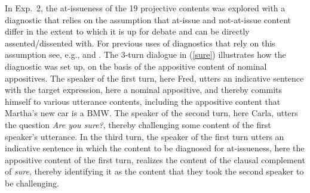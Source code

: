 \documentclass[11pt,fleqn]{article}
\newcommand{\6}{\mbox{$[\hspace*{-.6mm}[$}}
\newcommand{\9}{\mbox{$]\hspace*{-.6mm}]$}}
\begin{document}
In Exp.~2, the at-issueness of the 19 projective contents was explored with a diagnostic that relies on the assumption that at-issue and not-at-issue content differ in the extent to which it is up for debate and can be directly assented/dissented with. For previous uses of diagnostics that rely on this assumption see, e.g., \citealt{amaral-etal07,xue-onea11,murray2014,anderbois-etal2015,destruel-etal2015,tonhauser-sula6} and \citealt{syrett-koev2015}. The 3-turn dialogue in (\ref{sure}) illustrates how the diagnostic was set up, on the basis of the appositive content of nominal appositives. The speaker of the first turn, here Fred, utters an indicative sentence with the target expression, here a nominal appositive, and thereby commits himself to various utterance contents, including the appositive content that Martha's new car is a BMW. The speaker of the second turn, here Carla, utters the question {\em Are you sure?}, thereby challenging some content of the first speaker's utterance. In the third turn, the speaker of the first turn utters an indicative sentence in which the content to be diagnosed for at-issueness, here the appositive content of the first turn, realizes the content of the clausal complement of {\em sure}, thereby identifying it as the content that they took the second speaker to be challenging. 
\end{document}
